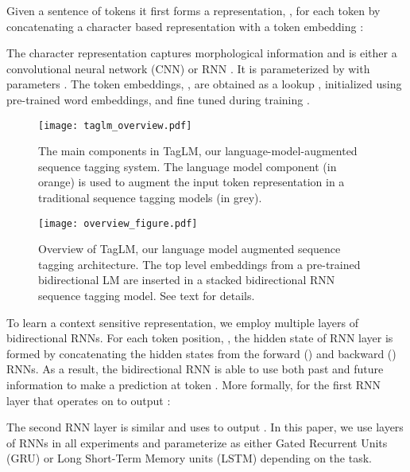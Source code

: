 \documentclass[11pt,a4paper]{article}
\begin{document}
Given a sentence of tokens  it first forms a representation, , for each token
by concatenating a character based representation  with a token
embedding :

The character representation  captures morphological information and
is either a convolutional neural network (CNN) \citep{Ma2016EndtoendSL,chiu-nichols-2016} or RNN \citep{yang-transfer-iclr07,lample-EtAl:2016:N16-1}.  It is parameterized by  with parameters
. The token embeddings, , are obtained as a lookup
, initialized using pre-trained
word embeddings, and fine tuned during training \citep{NLPfromScratch:Collobert2011}.


\begin{figure}[t]
\begin{center}
\texttt{[image: taglm\_overview.pdf]}
\end{center}
\caption{\label{fig:major_components} The main components in TagLM, our language-model-augmented sequence tagging system. The language model component (in orange) is used to augment the input token representation in a traditional sequence tagging models (in grey).}
\end{figure}

\begin{figure*}[t]
\begin{center}
\texttt{[image: overview\_figure.pdf]}
\end{center}
\caption{\label{overview-figure} Overview of TagLM, our language model augmented sequence tagging architecture.  The top level embeddings from a pre-trained bidirectional LM
are inserted in a stacked bidirectional RNN sequence tagging model.  See text for details.}
\end{figure*}



To learn a context sensitive representation, we employ multiple layers of bidirectional RNNs.
For each token position, , the hidden state
 of RNN layer  is formed
by concatenating the hidden states from the forward () and backward () RNNs.  As a result, the bidirectional RNN is able to use both past and future information
to make a prediction at token .  More formally, for the first RNN layer that operates on  to output :

The second RNN layer is similar and uses  to output .
In this paper, we use  layers of RNNs in all experiments and parameterize  as either
Gated Recurrent Units (GRU) \citep{GRU:Cho2014} or
Long Short-Term Memory units (LSTM) \citep{LSTM:Hochreiter1997} depending on the task.
\end{document}
